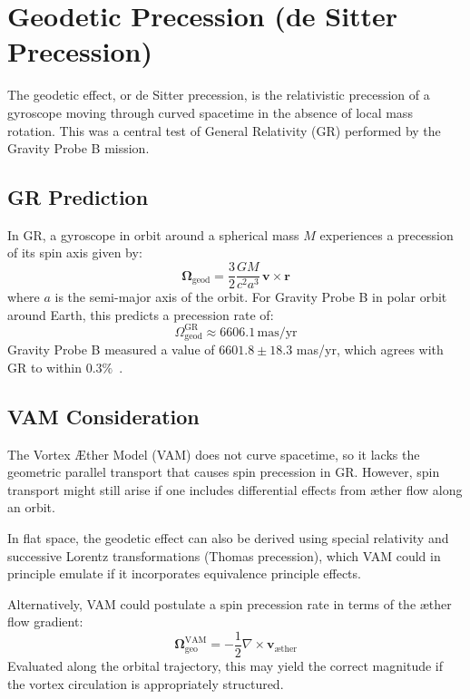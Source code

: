 \section{Geodetic Precession (de Sitter Precession)}

The geodetic effect, or de Sitter precession, is the relativistic precession of a gyroscope moving through curved spacetime in the absence of local mass rotation. This was a central test of General Relativity (GR) performed by the Gravity Probe B mission.

\subsection*{GR Prediction}

In GR, a gyroscope in orbit around a spherical mass $M$ experiences a precession of its spin axis given by:
\begin{equation}
    \boldsymbol{\Omega}_\text{geod} = \frac{3}{2} \frac{GM}{c^2 a^3} \, \mathbf{v} \times \mathbf{r}
\end{equation}
where $a$ is the semi-major axis of the orbit. For Gravity Probe B in polar orbit around Earth, this predicts a precession rate of:
\begin{equation}
    \Omega_\text{geod}^\text{GR} \approx 6606.1 \, \text{mas/yr}
\end{equation}
Gravity Probe B measured a value of $6601.8 \pm 18.3$ mas/yr, which agrees with GR to within $0.3\%$~\cite{everitt2011}.

\subsection*{VAM Consideration}

The Vortex Æther Model (VAM) does not curve spacetime, so it lacks the geometric parallel transport that causes spin precession in GR. However, spin transport might still arise if one includes differential effects from æther flow along an orbit.

In flat space, the geodetic effect can also be derived using special relativity and successive Lorentz transformations (Thomas precession), which VAM could in principle emulate if it incorporates equivalence principle effects.

Alternatively, VAM could postulate a spin precession rate in terms of the æther flow gradient:
\begin{equation}
    \boldsymbol{\Omega}_\text{geo}^\text{VAM} = -\frac{1}{2} \nabla \times \mathbf{v}_\text{æther}
\end{equation}
Evaluated along the orbital trajectory, this may yield the correct magnitude if the vortex circulation is appropriately structured.

